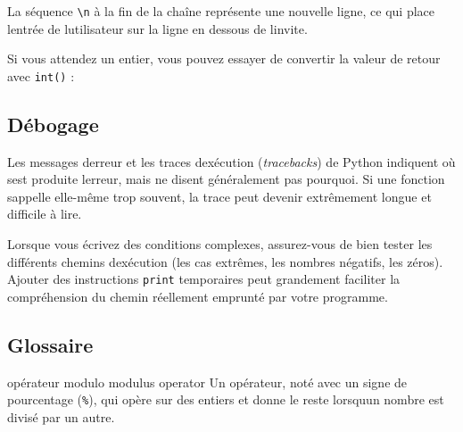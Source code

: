 La séquence \texttt{\textbackslash{}n} à la fin de la chaîne représente
une nouvelle ligne, ce qui place l\textquotesingle entrée de
l\textquotesingle utilisateur sur la ligne en dessous de
l\textquotesingle invite.

Si vous attendez un entier, vous pouvez essayer de convertir la valeur
de retour avec \texttt{int()} :

\begin{Shaded}
\begin{Highlighting}[]
\OperatorTok{\textgreater{}\textgreater{}\textgreater{}}\OperatorTok{=} \CharTok{\textbackslash{}\textquotesingle{}}\StringTok{\textquotesingle{}}
\OperatorTok{\textgreater{}\textgreater{}\textgreater{}}\OperatorTok{=} 
\end{Highlighting}
\end{Shaded}

\hypertarget{duxe9bogage}{%
\subsection{Débogage}\label{duxe9bogage}}

Les messages d\textquotesingle erreur et les traces
d\textquotesingle exécution (\emph{tracebacks}) de Python indiquent où
s\textquotesingle est produite l\textquotesingle erreur, mais ne disent
généralement pas pourquoi. Si une fonction s\textquotesingle appelle
elle-même trop souvent, la trace peut devenir extrêmement longue et
difficile à lire.

Lorsque vous écrivez des conditions complexes, assurez-vous de bien
tester les différents chemins d\textquotesingle exécution (les cas
extrêmes, les nombres négatifs, les zéros). Ajouter des instructions
\texttt{print} temporaires peut grandement faciliter la compréhension du
chemin réellement emprunté par votre programme.

\hypertarget{glossaire}{%
\subsection{Glossaire}\label{glossaire}}

opérateur modulo modulus operator Un opérateur, noté avec un signe de
pourcentage (\texttt{\%}), qui opère sur des entiers et donne le reste
lorsqu\textquotesingle un nombre est divisé par un autre.

